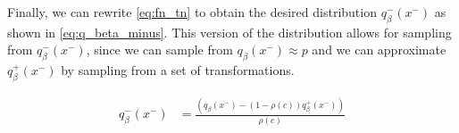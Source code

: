 Finally, we can rewrite \eqref{eq:fn_tn} to obtain the desired distribution $q^-_{\beta}(x^-)$ as shown in \eqref{eq:q_beta_minus}.
This version of the distribution allows for sampling from $q^-_{\beta}(x^-)$, since we can sample from $q_\beta(x^-) \approx p$ 
and we can approximate $q^{+}_\beta(x^-)$ by sampling from a set of transformations.    %

\begin{align}
    q^{-}_\beta(x^-) &= \frac{(q_\beta(x^-)-(1-\rho(c))q^{+}_\beta(x^-))}{\rho(c)} 
    \label{eq:q_beta_minus}
\end{align}



